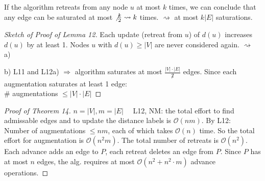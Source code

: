 \documentclass[12pt,oneside,a4paper,parskip=on,fleqn]{scrartcl}
\begin{document}
If the algorithm retreats from any node $u$ at most $k$ times, we can conclude that any edge can be saturated at most $\not\frac{k}{2} \rightsquigarrow k$ times. $\rightsquigarrow$ at most $k|E|$ saturations.

\begin{proof}[Sketch of Proof of Lemma 12]
	Each update (retreat from $u$) of $d(u)$ increases $d(u)$ by at least 1. Nodes $u$ with $d(u) \geq |V|$ are never considered again. $\rightsquigarrow$ a)

	b) L11 and L12a) $\Rightarrow$ algorithm saturates at most $\frac{|V|\cdot |E|}{\not2}$ edges. Since each augmentation saturates at least 1 edge:\\
	\# augmentations $\leq |V|\cdot |E|$
\end{proof}

\begin{proof}[Proof of Theorem 14]
		$n = |V|, m=|E|\quad$  L12, NM: the total effort to find admissable edges and to update the distance labels is $\mathcal{O}(nm)$. By L12:\\
		Number of augmentations $\leq nm$, each of which takes $\mathcal{O}(n)$ time. So the total effort for augmentation is $\mathcal{O}(n^2m)$. The total number of retreats is $\mathcal{O}(n^2)$. Each advance adds an edge to $P$, each retreat deletes an edge from $P$. Since $P$ has at most $n$ edges, the alg. requires at most $\mathcal{O}(n^2 + n^2\cdot m)$ advance operations.
\end{proof}
\end{document}
